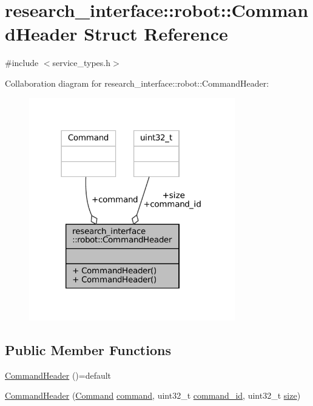 \hypertarget{structresearch__interface_1_1robot_1_1CommandHeader}{}\section{research\+\_\+interface\+:\+:robot\+:\+:Command\+Header Struct Reference}
\label{structresearch__interface_1_1robot_1_1CommandHeader}


{\ttfamily \#include $<$service\+\_\+types.\+h$>$}



Collaboration diagram for research\+\_\+interface\+:\+:robot\+:\+:Command\+Header\+:
\nopagebreak
\begin{figure}[H]
\begin{center}
\leavevmode
\includegraphics[width=254pt]{structresearch__interface_1_1robot_1_1CommandHeader__coll__graph}
\end{center}
\end{figure}
\subsection*{Public Member Functions}
\begin{DoxyCompactItemize}
\item 
\hyperlink{structresearch__interface_1_1robot_1_1CommandHeader_a267aaad4b31ede9e092931f2b5e3ae89}{Command\+Header} ()=default
\item 
\hyperlink{structresearch__interface_1_1robot_1_1CommandHeader_acce3f51a361d5c9ec6099ca78f6a83ac}{Command\+Header} (\hyperlink{namespaceresearch__interface_1_1robot_a72624b344f0614e623ef21a53fb0aa50}{Command} \hyperlink{structresearch__interface_1_1robot_1_1CommandHeader_aad68e81f17365edd95d80c7f35684edc}{command}, uint32\+\_\+t \hyperlink{structresearch__interface_1_1robot_1_1CommandHeader_a915f5eddf273cb6279e817b2aa80a5bb}{command\+\_\+id}, uint32\+\_\+t \hyperlink{structresearch__interface_1_1robot_1_1CommandHeader_a1f4f17f7edc9169e3eb0ca7480d17b34}{size})
\end{DoxyCompactItemize}

